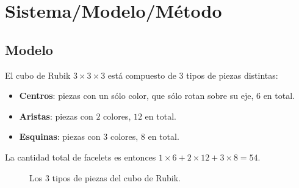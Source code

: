 \chapter{Sistema/Modelo/Método}

\section{Modelo}
El cubo de Rubik $3 \times 3 \times 3$ está compuesto de $3$ tipos de piezas distintas:
\begin{itemize}
	\item \textbf{Centros}: piezas con un sólo color, que sólo rotan sobre su eje, $6$ en total.
	\item \textbf{Aristas}: piezas con $2$ colores, $12$ en total.
	\item \textbf{Esquinas}: piezas con $3$ colores, $8$ en total.
\end{itemize}
La cantidad total de facelets es entonces $1\times 6 + 2\times 12 + 3\times 8 = 54$.
\begin{figure}[h!]
	\centering
	\hfill
	\hfill
	\caption{Los $3$ tipos de piezas del cubo de Rubik.}
\end{figure}

